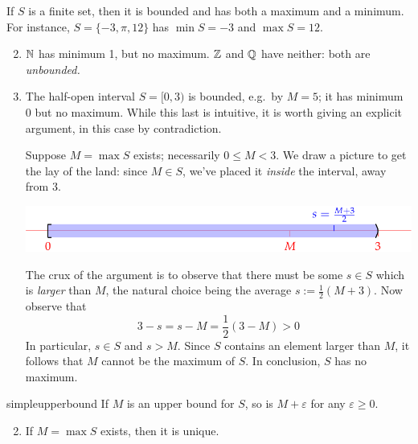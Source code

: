 \begin{examples}{}{}
	\exstart If $S$ is a finite set, then it is bounded and has both a maximum and a minimum. For instance, $S=\{-3,\pi,12\}$ has $\min S=-3$ and $\max S=12$.
	\begin{enumerate}\setcounter{enumi}{1}
		\item $\mathbb{N}$ has minimum 1, but no maximum. $\mathbb{Z}$ and $\mathbb{Q}$ have neither: both are \emph{unbounded.}
		
		\item The half-open interval $S=[0,3)$ is bounded, e.g.\ by $M=5$; it has minimum 0 but no maximum. While this last is intuitive, it is worth giving an explicit argument, in this case by contradiction.\footnotemark{}\par
		Suppose $M=\max S$ exists; necessarily $0\le M<3$. We draw a picture to get the lay of the land: since $M\in S$, we've placed it \emph{inside} the interval, away from 3.
		\begin{center}\vspace{-15pt}
	  	\includegraphics{nomax1}\vspace{-10pt}
	  \end{center}
	  The crux of the argument is to observe that there must be some $s\in S$ which is \emph{larger} than $M$, the natural choice being the average $s:=\frac 12(M+3)$. Now observe that
	  \[
	  	3-s=s-M=\frac 12(3-M)>0
	  \]
	  In particular, $s\in S$ and $s>M$. Since $S$ contains an element larger than $M$, it follows that $M$ cannot be the maximum of $S$. In conclusion, $S$ has no maximum.
	\end{enumerate}
\end{examples}



\begin{lemm}{}{simpleupperbound}
	\exstart If $M$ is an upper bound for $S$, so is $M+\varepsilon$ for any $\varepsilon\ge 0$.
	\begin{enumerate}\setcounter{enumi}{1}
	  \item If $M=\max S$ exists, then it is unique.
% 	  
	\end{enumerate}
\end{lemm}

